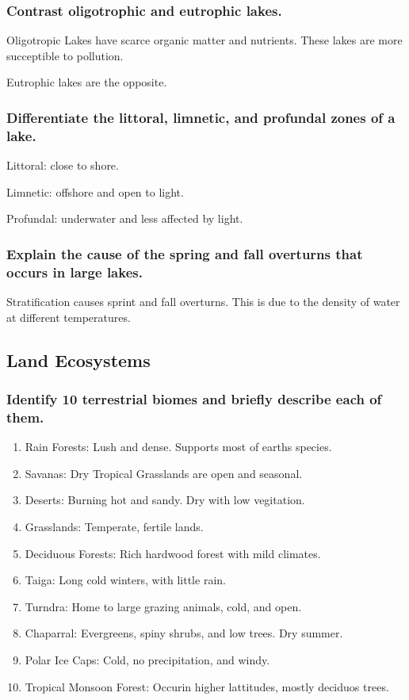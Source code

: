 \documentclass[a4paper]{article}
\begin{document}
\subsubsection{Contrast oligotrophic and eutrophic lakes.}
Oligotropic Lakes have scarce organic matter and nutrients. These lakes are more succeptible to pollution.

Eutrophic lakes are the opposite.

\subsubsection{Differentiate the littoral, limnetic, and profundal zones of a lake.}
Littoral: close to shore.

Limnetic: offshore and open to light.

Profundal: underwater and less affected by light.

\subsubsection{Explain the cause of the spring and fall overturns that occurs in large lakes.}
Stratification causes sprint and fall overturns. This is due to the density of water at different temperatures.

\subsection{Land Ecosystems}
\subsubsection{Identify 10 terrestrial biomes and briefly describe each of them.}
\begin{enumerate}
  \item Rain Forests: Lush and dense. Supports most of earths species.
  \item Savanas: Dry Tropical Grasslands are open and seasonal.
  \item Deserts: Burning hot and sandy. Dry with low vegitation.
  \item Grasslands: Temperate, fertile lands.
  \item Deciduous Forests: Rich hardwood forest with mild climates.
  \item Taiga: Long cold winters, with little rain.
  \item Turndra: Home to large grazing animals, cold, and open.
  \item Chaparral: Evergreens, spiny shrubs, and low trees. Dry summer.
  \item Polar Ice Caps: Cold, no precipitation, and windy. 
  \item Tropical Monsoon Forest: Occurin higher lattitudes, mostly deciduos trees.
\end{enumerate}
\end{document}
